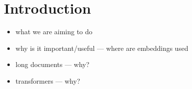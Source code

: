 \chapter*{Introduction}

\begin{itemize}
    \item what we are aiming to do
    \item why is it important/useful --- where are embeddings used
    \item long documents --- why?
    \item transformers --- why?
\end{itemize}


